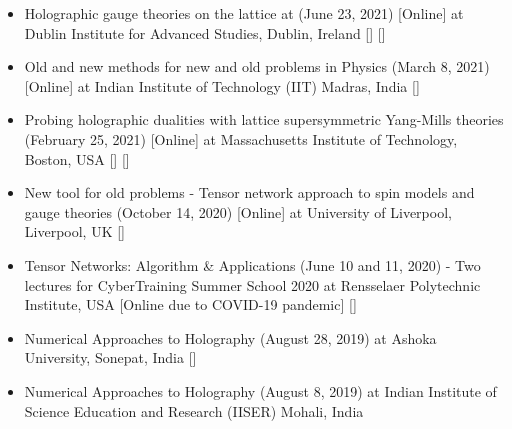 \begin{itemize}
 \item Holographic gauge theories on the lattice at 
 (June 23, 2021) [Online] at Dublin Institute for Advanced Studies, Dublin, Ireland 
  [\texttt{\textbf{}}]  [\texttt{\textbf{}}] 
  \vspace{1mm} 
  
 \item Old and new methods for new and old problems in Physics
 (March 8, 2021) [Online] at Indian Institute of Technology (IIT) Madras, India
  [\texttt{\textbf{}}] 
\vspace{1mm} 
 
 \item Probing holographic dualities with lattice supersymmetric Yang-Mills theories 
 (February 25, 2021) [Online] at Massachusetts Institute of Technology, Boston, USA 
   [\texttt{\textbf{}}]  [\texttt{\textbf{}}] 
 \vspace{1mm} 
 
 \item New tool for old problems - Tensor network approach to spin models and gauge theories 
 (October 14, 2020) [Online] at University of Liverpool, Liverpool, UK
  [\texttt{\textbf{}}] 
 \vspace{1mm} 
  
 \item Tensor Networks: Algorithm \& Applications (June 10 and 11, 2020) - Two lectures for 
 CyberTraining Summer School 2020 at Rensselaer Polytechnic Institute, USA [Online due to COVID-19 pandemic]  
   [\texttt{\textbf{}}]  
\vspace{1mm} 

 \item Numerical Approaches to Holography (August 28, 2019) at Ashoka University, Sonepat, India [\texttt{\textbf{}}] 
\vspace{1mm} 
 
 \item Numerical Approaches to Holography (August 8, 2019) at Indian Institute of Science Education and Research (IISER) Mohali, India \vspace{1mm} 
 

\end{itemize}
